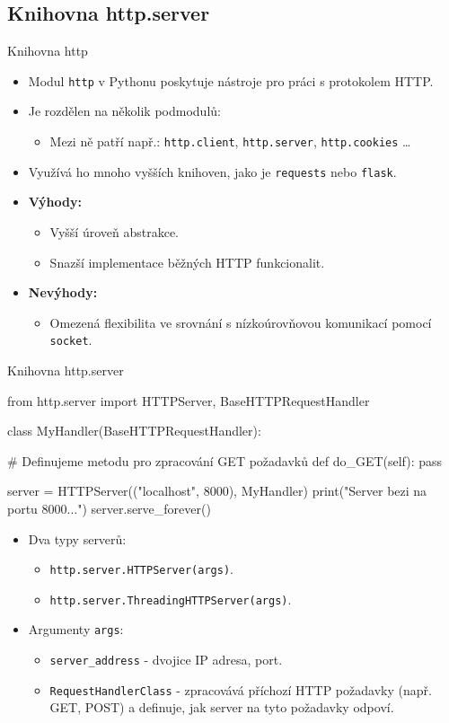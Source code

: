 \documentclass{beamer}
\begin{document}
\subsection{Knihovna http.server}
\begin{frame}{Knihovna http}
	\begin{itemize}
		\item Modul \texttt{http} v Pythonu poskytuje nástroje pro práci s protokolem HTTP.
		\item Je rozdělen na několik podmodulů:
		\begin{itemize}
			\item Mezi ně patří např.: \texttt{http.client}, \texttt{http.server}, \texttt{http.cookies} \ldots
		\end{itemize}
		\item Využívá ho mnoho vyšších knihoven, jako je \texttt{requests} nebo \texttt{flask}.
		\item \textbf{Výhody:}
		\begin{itemize}
			\item Vyšší úroveň abstrakce.
			\item Snazší implementace běžných HTTP funkcionalit.
		\end{itemize}
		\item \textbf{Nevýhody:}
		\begin{itemize}
			\item Omezená flexibilita ve srovnání s nízkoúrovňovou komunikací pomocí \texttt{socket}.
		\end{itemize}
	\end{itemize}	
\end{frame}
\begin{frame}{Knihovna http.server}
    \begin{semiverbatim}
	from http.server import HTTPServer, BaseHTTPRequestHandler

	class MyHandler(BaseHTTPRequestHandler):

		# Definujeme metodu pro zpracování GET požadavků
		def do_GET(self):
			pass

	server = HTTPServer(("localhost", 8000), MyHandler)
	print("Server bezi na portu 8000...")
	server.serve_forever()
    \end{semiverbatim}

	\begin{itemize}
		\item Dva typy serverů:
		\begin{itemize}
			\item \texttt{http.server.HTTPServer(args)}.
			\item \texttt{http.server.ThreadingHTTPServer(args)}.
		\end{itemize}
		\item Argumenty \texttt{args}:
		\begin{itemize}
			\item \texttt{server\_address} - dvojice IP adresa, port.
			\item \texttt{RequestHandlerClass} - zpracovává příchozí HTTP požadavky (např. GET, POST) a definuje, jak server na tyto požadavky odpoví.
		\end{itemize}
	\end{itemize}	
\end{frame}
\end{document}
